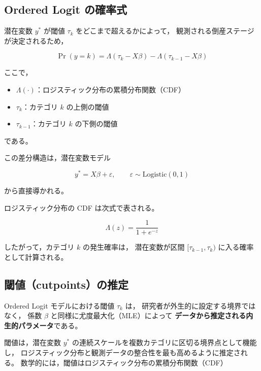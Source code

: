 \subsection{Ordered Logit の確率式}

潜在変数 $y^*$ が閾値 $\tau_k$ をどこまで超えるかによって，
観測される倒産ステージが決定されるため，

\begin{equation}
\Pr(y = k)
=
\Lambda(\tau_k - X\beta)
-
\Lambda(\tau_{k-1} - X\beta)
\label{eq:ordered_prob}
\end{equation}

ここで，

\begin{itemize}
    \item $\Lambda(\cdot)$：ロジスティック分布の累積分布関数（CDF）
    \item $\tau_k$：カテゴリ $k$ の上側の閾値
    \item $\tau_{k-1}$：カテゴリ $k$ の下側の閾値
\end{itemize}

である。

この差分構造は，潜在変数モデル



\[
y^* = X\beta + \varepsilon, \qquad \varepsilon \sim \text{Logistic}(0,1)
\]



から直接導かれる。

ロジスティック分布の CDF は次式で表される。



\[
\Lambda(z) = \frac{1}{1 + e^{-z}}
\]



したがって，カテゴリ $k$ の発生確率は，
潜在変数が区間 $[\tau_{k-1}, \tau_k)$ に入る確率として計算される。


\subsection{閾値（cutpoints）の推定}

Ordered Logit モデルにおける閾値 $\tau_k$ は，
研究者が外生的に設定する境界ではなく，
係数 $\beta$ と同様に尤度最大化（MLE）によって
\textbf{データから推定される内生的パラメータ}である。

閾値は，潜在変数 $y^*$ の連続スケールを複数カテゴリに区切る境界点として機能し，
ロジスティック分布と観測データの整合性を最も高めるように推定される。
数学的には，閾値はロジスティック分布の累積分布関数（CDF）



